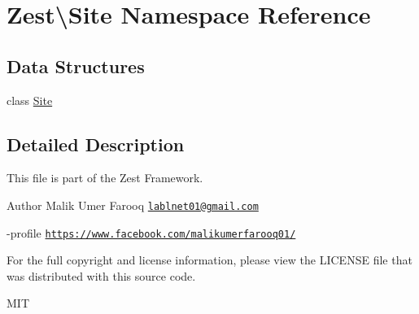\hypertarget{namespace_zest_1_1_site}{}\section{Zest\textbackslash{}Site Namespace Reference}
\label{namespace_zest_1_1_site}
\subsection*{Data Structures}
\begin{DoxyCompactItemize}
\item 
class \mbox{\hyperlink{class_zest_1_1_site_1_1_site}{Site}}
\end{DoxyCompactItemize}


\subsection{Detailed Description}
This file is part of the Zest Framework.

\begin{DoxyAuthor}{Author}
Malik Umer Farooq \href{mailto:lablnet01@gmail.com}{\tt lablnet01@gmail.\+com} 

-\/profile \href{https://www.facebook.com/malikumerfarooq01/}{\tt https\+://www.\+facebook.\+com/malikumerfarooq01/}
\end{DoxyAuthor}
For the full copyright and license information, please view the L\+I\+C\+E\+N\+SE file that was distributed with this source code.

M\+IT 